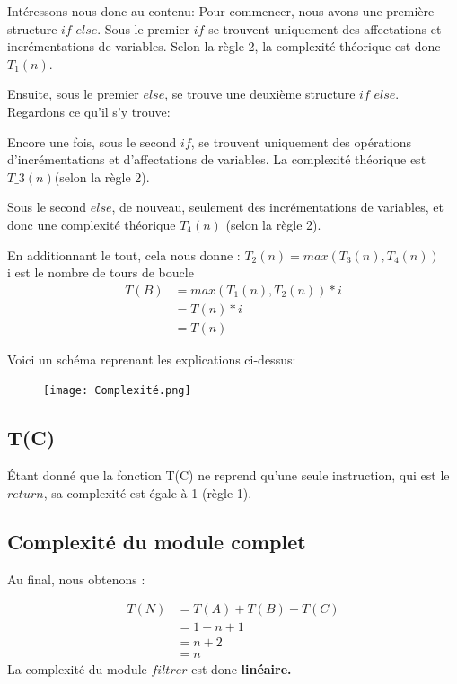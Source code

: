 \documentclass[a4paper, 11pt, oneside]{article}
\begin{document}
Intéressons-nous donc au contenu: 
Pour commencer, nous avons une première structure $if$ $else$. Sous le premier $if$ se trouvent uniquement des affectations et incrémentations de variables. Selon la règle 2, la complexité théorique est donc $T_1(n)$. 


Ensuite, sous le premier $else$, se trouve une deuxième structure $if$ $else$. Regardons ce qu'il s'y trouve:

Encore une fois, sous le second $if$, se trouvent uniquement des opérations d'incrémentations et d'affectations de variables. La complexité théorique est $T\_3(n)$(selon la règle 2). 

Sous le second $else$, de nouveau, seulement des incrémentations de variables, et donc une complexité théorique $T_4(n)$ (selon la règle 2). 


En additionnant le tout, cela nous donne : 
$T_2(n) =  max(T_3(n), T_4(n))$
\\i est le nombre de tours de boucle
\begin{align}
  T(B) &= max(T_1(n), T_2(n)) * i\nonumber \\
       &= T(n) * i  \nonumber \\
       &=T(n) \nonumber
\end{align}

Voici un schéma reprenant les explications ci-dessus:
\\
\begin{figure}
\centering \texttt{[image: Complexité.png]}
\end{figure}

\subsection{T(C)}

Étant donné que la fonction T(C) ne reprend qu'une seule instruction, qui est le $return$, sa complexité est égale à 1 (règle 1).

\subsection{Complexité du module complet}

Au final, nous obtenons :

\begin{align}
  T(N) &= T(A) + T(B) + T(C) \nonumber \\
       &= 1 + n + 1 \nonumber \\
       &= n + 2 \nonumber \\
       &= n
\end{align}
La complexité du module $filtrer$ est donc \bf linéaire.
\end{document}
